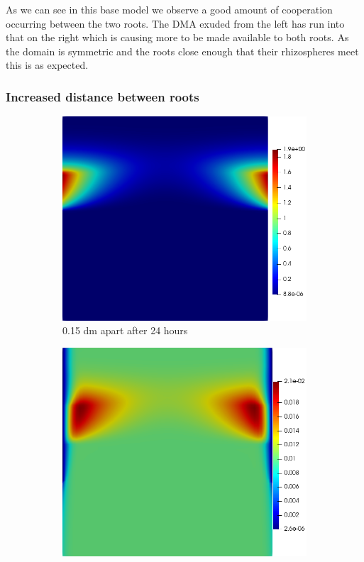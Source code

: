 \documentclass[11pt]{article}
\numberwithin{equation}{section}
\begin{document}
 As we can see in this base model we observe a good amount of cooperation occurring between the two roots. The DMA exuded from the left has run into that on the right which is causing more  to be made available to both roots. As the domain is symmetric and the roots close enough that their rhizospheres meet this is as expected. 
\subsubsection{Increased distance between roots}
 \begin{figure}
     \centering
     \begin{subfigure}[t]{0.35\textwidth}
     \includegraphics[width=\textwidth]{Figures/testpics/0.15ApartDMA24.png}
     \caption{0.15 dm apart  after 24 hours}
     \end{subfigure}
     \hspace{1cm}
     \begin{subfigure}[t]{0.35\textwidth}
     \includegraphics[width=\textwidth]{Figures/testpics/0.15ApartZn24.png}

\end{subfigure}
\end{figure}
\end{document}
